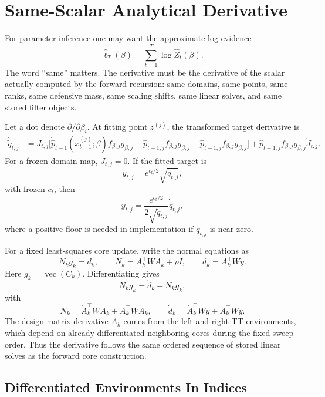 \documentclass[11pt]{article}
\newcommand{\vecop}{\operatorname{vec}}
\begin{document}
\section{Same-Scalar Analytical Derivative}

For parameter inference one may want the approximate log evidence
\[
    \widehat\ell_T(\beta)
    =
    \sum_{t=1}^T \log \widehat Z_t(\beta).
    \tag{G1}
\]
The word ``same'' matters.  The derivative must be the derivative of the scalar
actually computed by the forward recursion: same domains, same points, same
ranks, same defensive mass, same scaling shifts, same linear solves, and same
stored filter objects.

Let a dot denote \(\partial/\partial\beta_i\).  At fitting point \(z^{(j)}\),
the transformed target derivative is
\[
\begin{aligned}
 \dot{\widetilde q}_{t,j}
 &=
 J_{t,j}
 \Big[
 \dot{\widehat p}_{t-1}(x_{t-1}^{(j)};\beta)
 f_{\beta,j}g_{\beta,j}
 + \widehat p_{t-1,j}\dot f_{\beta,j}g_{\beta,j}
 + \widehat p_{t-1,j}f_{\beta,j}\dot g_{\beta,j}
 \Big]
 + \widehat p_{t-1,j}f_{\beta,j}g_{\beta,j}\dot J_{t,j}.
\end{aligned}
\tag{G2}
\]
For a frozen domain map, \(\dot J_{t,j}=0\).  If the fitted target is
\[
    y_{t,j}=e^{c_t/2}\sqrt{\widetilde q_{t,j}},
\]
with frozen \(c_t\), then
\[
    \dot y_{t,j}
    =
    \frac{e^{c_t/2}}{2\sqrt{\widetilde q_{t,j}}}
    \dot{\widetilde q}_{t,j},
    \tag{G3}
\]
where a positive floor is needed in implementation if \(\widetilde q_{t,j}\) is
near zero.

For a fixed least-squares core update, write the normal equations as
\[
    N_k g_k=d_k,
    \qquad
    N_k=A_k^\top W A_k+\rho I,
    \qquad
    d_k=A_k^\top W y.
    \tag{G4}
\]
Here \(g_k=\vecop(C_k)\).  Differentiating gives
\[
    N_k\dot g_k
    =
    \dot d_k-\dot N_k g_k,
    \tag{G5}
\]
with
\[
    \dot N_k
    =
    \dot A_k^\top W A_k+A_k^\top W\dot A_k,
    \qquad
    \dot d_k
    =
    \dot A_k^\top Wy+A_k^\top W\dot y.
    \tag{G6}
\]
The design matrix derivative \(\dot A_k\) comes from the left and right TT
environments, which depend on already differentiated neighboring cores during
the fixed sweep order.  Thus the derivative follows the same ordered sequence
of stored linear solves as the forward core construction.

\subsection{Differentiated Environments In Indices}
\end{document}
